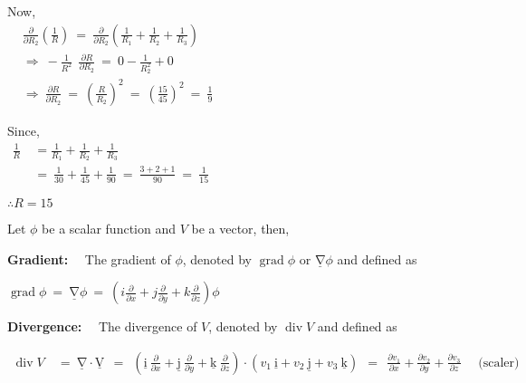\documentclass[12pt]{article}
\renewcommand{\vec}[1]{\underline{\mathrm{#1}}}
\begin{document}
\vspace{2ex}
\begin{minipage}[t]{0.49\linewidth}
\noindent
Now,\\[1ex]
$\begin{aligned}
   &\frac{\partial}{\partial{R_2}} \left(\frac{1}{R}\right)
   \ = \ \frac{\partial}{\partial{R_2}} \left(\frac{1}{R_1}+\frac{1}{R_2}+\frac{1}{R_3}\right)\\[1ex]
   &\Rightarrow \ -\frac{1}{R^2} \ \ \frac{\partial{R}}{\partial{R_2}}
   \ = \ 0 - \frac{1}{R_2^2} + 0\\[1ex]
   &\Rightarrow \ \frac{\partial{R}}{\partial{R_2}}
   \ = \ \left(\frac{R}{R_2}\right)^2
   \ = \ \left(\frac{15}{45}\right)^2
   \ = \ \frac{1}{9}
\end{aligned}$
\end{minipage}\hspace{0.5ex}{\vrule width 1pt}\hspace{0.5ex}
\begin{minipage}[t]{0.49\linewidth}
\noindent
Since,\\[1ex]
$\begin{aligned}
   \frac{1}{R} \ &= \frac{1}{R_1}+\frac{1}{R_2}+\frac{1}{R_3}\\[1ex]
   \ &= \ \frac{1}{30}+\frac{1}{45}+\frac{1}{90}
   \ = \ \frac{3+2+1}{90} \ = \ \frac{1}{15}
\end{aligned}$

\vspace{3ex}
$\therefore R = 15$
\end{minipage}

\vspace{5ex}
Let $\phi$ be a scalar function and $V$ be a vector, then,

\vspace{1ex}
\textbf{Gradient:} \ \ 
The gradient of $\phi$, denoted by $\operatorname{grad} \phi$ or $\vec{\nabla}\phi$ and defined as

\vspace{0.5ex}
$\operatorname{grad} \phi \ = \ \vec{\nabla}\phi \ = \ \left(i\frac{\partial}{\partial{x}} + j\frac{\partial}{\partial{y}} + k\frac{\partial}{\partial{z}}\right)\phi$


\vspace{2ex}
\textbf{Divergence:} \ \ 
The divergence of $V$, denoted by $\operatorname{div} V$ and defined as

\vspace{0.5ex}
$\begin{aligned}
\operatorname{div } V \ &= \ \vec{\nabla} \cdot \vec{V}
\ \ = \ \ \left(\vec{i} \ \frac{\partial}{\partial x}+\vec{j} \ \frac{\partial}{\partial y}+\vec{k} \ \frac{\partial}{\partial z}\right) \cdot\left(v_1 \ \vec{i}+v_2 \ \vec{j}+v_3 \ \vec{k}\right) 
\ \ = \ \ \frac{\partial v_1}{\partial x}+\frac{\partial v_2}{\partial y}+\frac{\partial v_3}{\partial z} \quad \text { (scaler) }
\end{aligned}$
\end{document}
